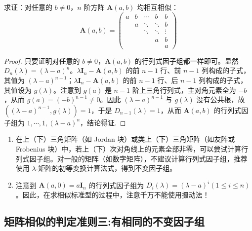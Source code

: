 \documentclass[../../main.tex]{subfiles}%
\begin{document}
\begin{proposition}\label{proposition:A(a,b)矩阵均相似}
求证：对任意的 $b \neq 0$，$n$ 阶方阵 $\boldsymbol{A}(a,b)$ 均相互相似：
\[
\boldsymbol{A}(a,b) = 
\begin{pmatrix}
a & b & \cdots & b & b \\
 & a & \ddots & \ddots & b \\
 & & \ddots & \ddots & \vdots \\
 & & & a & b \\
 & & & & a
\end{pmatrix}
\]
\end{proposition}
\begin{proof}

只要证明对任意的 $b \neq 0$，$\boldsymbol{A}(a,b)$ 的行列式因子组都一样即可。显然 $D_n(\lambda) = (\lambda - a)^n$。$\lambda \boldsymbol{I}_n - \boldsymbol{A}(a,b)$ 的前 $n - 1$ 行、前 $n - 1$ 列构成的子式，其值为 $(\lambda - a)^{n - 1}$；$\lambda \boldsymbol{I}_n - \boldsymbol{A}(a,b)$ 的前 $n - 1$ 行、后 $n - 1$ 列构成的子式，其值设为 $g(\lambda)$。注意到 $g(a)$ 是 $n - 1$ 阶上三角行列式，主对角元素全为 $-b$，从而 $g(a) = (-b)^{n - 1} \neq 0$。因此 $(\lambda - a)^{n - 1}$ 与 $g(\lambda)$ 没有公共根，故 $((\lambda - a)^{n - 1}, g(\lambda)) = 1$，于是 $D_{n - 1}(\lambda) = 1$，从而 $\boldsymbol{A}(a,b)$ 的行列式因子组为 $1, \cdots, 1, (\lambda - a)^n$，结论得证.

\end{proof}
\begin{remark}
\begin{enumerate}[(1)]
\item 在上（下）三角矩阵（如 Jordan 块）或类上（下）三角矩阵（如友阵或 Frobenius 块）中，若上（下）次对角线上的元素全部非零，可以尝试计算行列式因子组。对一般的矩阵（如数字矩阵），不建议计算行列式因子组，推荐使用 $\lambda$-矩阵的初等变换计算法式，得到不变因子组。


\item 注意到 $\boldsymbol{A}(a,0) = a\boldsymbol{I}_n$ 的行列式因子组为 $D_i(\lambda) = (\lambda - a)^i (1 \leqslant  i \leqslant  n)$。因此，在求相似标准型的过程中，注意千万不能使用摄动法！ 
\end{enumerate}
\end{remark}



\subsection{矩阵相似的判定准则三:有相同的不变因子组}
\end{document}
